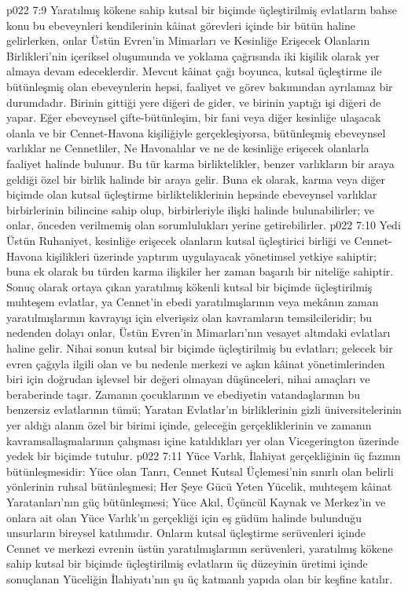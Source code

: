 \vs p022 7:9 Yaratılmış kökene sahip kutsal bir biçimde üçleştirilmiş evlatların bahse konu bu ebeveynleri kendilerinin kâinat görevleri içinde bir bütün haline gelirlerken, onlar Üstün Evren’in Mimarları ve Kesinliğe Erişecek Olanların Birlikleri’nin içeriksel oluşumunda ve yoklama çağrısında iki kişilik olarak yer almaya devam edeceklerdir. Mevcut kâinat çağı boyunca, kutsal üçleştirme ile bütünleşmiş olan ebeveynlerin hepsi, faaliyet ve görev bakımından ayrılamaz bir durumdadır. Birinin gittiği yere diğeri de gider, ve birinin yaptığı işi diğeri de yapar. Eğer ebeveynsel çifte\hyp{}bütünleşim, bir fani veya diğer kesinliğe ulaşacak olanla ve bir Cennet\hyp{}Havona kişiliğiyle gerçekleşiyorsa, bütünleşmiş ebeveynsel varlıklar ne Cennetliler, Ne Havonalılar ve ne de kesinliğe erişecek olanlarla faaliyet halinde bulunur. Bu tür karma birliktelikler, benzer varlıkların bir araya geldiği özel bir birlik halinde bir araya gelir. Buna ek olarak, karma veya diğer biçimde olan kutsal üçleştirme birlikteliklerinin hepsinde ebeveynsel varlıklar birbirlerinin bilincine sahip olup, birbirleriyle ilişki halinde bulunabilirler; ve onlar, önceden verilmemiş olan sorumlulukları yerine getirebilirler.
\vs p022 7:10 Yedi Üstün Ruhaniyet, kesinliğe erişecek olanların kutsal üçleştirici birliği ve Cennet\hyp{}Havona kişilikleri üzerinde yaptırım uygulayacak yönetimsel yetkiye sahiptir; buna ek olarak bu türden karma ilişkiler her zaman başarılı bir niteliğe sahiptir. Sonuç olarak ortaya çıkan yaratılmış kökenli kutsal bir biçimde üçleştirilmiş muhteşem evlatlar, ya Cennet’in ebedi yaratılmışlarının veya mekânın zaman yaratılmışlarının kavrayışı için elverişsiz olan kavramların temsilcileridir; bu nedenden dolayı onlar, Üstün Evren’in Mimarları’nın vesayet altındaki evlatları haline gelir. Nihai sonun kutsal bir biçimde üçleştirilmiş bu evlatları; gelecek bir evren çağıyla ilgili olan ve bu nedenle merkezi ve aşkın kâinat yönetimlerinden biri için doğrudan işlevsel bir değeri olmayan düşünceleri, nihai amaçları ve  beraberinde taşır. Zamanın çocuklarının ve ebediyetin vatandaşlarının bu benzersiz evlatlarının tümü; Yaratan Evlatlar’ın birliklerinin gizli üniversitelerinin yer aldığı alanın özel bir birimi içinde, geleceğin gerçekliklerinin ve zamanın kavramsallaşmalarının çalışması içine katıldıkları yer olan Vicegerington üzerinde yedek bir biçimde tutulur.
\vs p022 7:11 Yüce Varlık, İlahiyat gerçekliğinin üç fazının bütünleşmesidir: Yüce olan Tanrı, Cennet Kutsal Üçlemesi’nin sınırlı olan belirli yönlerinin ruhsal bütünleşmesi; Her Şeye Gücü Yeten Yücelik, muhteşem kâinat Yaratanları’nın güç bütünleşmesi; Yüce Akıl, Üçüncül Kaynak ve Merkez’in ve onlara ait olan Yüce Varlık’ın gerçekliği için eş güdüm halinde bulunduğu unsurların bireysel katılımıdır. Onların kutsal üçleştirme serüvenleri içinde Cennet ve merkezi evrenin üstün yaratılmışlarının serüvenleri, yaratılmış kökene sahip kutsal bir biçimde üçleştirilmiş evlatların üç düzeyinin üretimi içinde sonuçlanan Yüceliğin İlahiyatı’nın şu üç katmanlı yapıda olan bir keşfine katılır.
